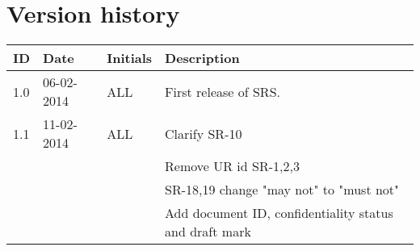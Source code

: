\documentclass[Main]{subfiles}
\begin{document}
\section*{Version history}

\begin{tabular}{p{} p{} p{} p{}}
\hline
\textbf{ID} & \textbf{Date} & \textbf{Initials} & \textbf{Description}
\\
\hline
1.0 & 06-02-2014 & ALL & First release of SRS.
\\ 
1.1 & 11-02-2014 & ALL & Clarify SR-10
\\ &&&Remove UR id SR-1,2,3
\\ &&&SR-18,19 change "may not" to "must not"
\\ &&&Add document ID, confidentiality status and draft mark
\\ \hline 
\end{tabular} 
\end{document}
